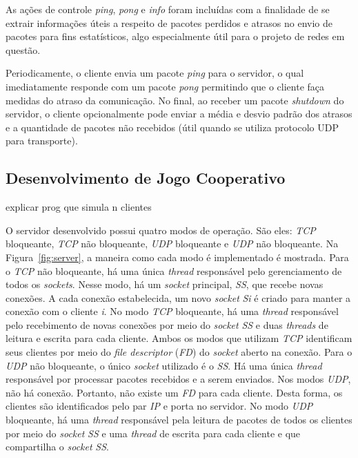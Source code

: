 \documentclass[12pt]{article}
\begin{document}
As ações de controle \textit{ping}, \textit{pong} e \textit{info} foram
incluídas com a finalidade de se extrair informações úteis a respeito de
pacotes perdidos e atrasos no envio de pacotes para fins estatísticos, algo
especialmente útil para o projeto de redes em questão.

Periodicamente, o cliente envia um pacote \textit{ping} para o servidor, o qual
imediatamente responde com um pacote \textit{pong} permitindo que o cliente
faça medidas do atraso da comunicação. No final, ao receber um pacote
\textit{shutdown} do servidor, o cliente opcionalmente pode enviar a média e
desvio padrão dos atrasos e a quantidade de pacotes não recebidos (útil quando
se utiliza protocolo UDP para transporte).

\subsection{Desenvolvimento de Jogo Cooperativo} \label{sub:desenvolvimento}

explicar prog que simula n clientes

O servidor desenvolvido possui quatro modos de operação. São eles: \emph{TCP} bloqueante, \emph{TCP} não bloqueante, \emph{UDP} bloqueante e \emph{UDP} não bloqueante. Na Figura~\ref{fig:server}, a maneira como cada modo é implementado é mostrada. Para o \emph{TCP} não bloqueante, há uma única \emph{thread} responsável pelo gerenciamento de todos os \emph{sockets}. Nesse modo, há um \emph{socket} principal, \emph{SS}, que recebe novas conexões. A cada conexão estabelecida, um novo \emph{socket} \emph{Si} é criado para manter a conexão com o cliente \emph{i}. No modo \emph{TCP} bloqueante, há uma \emph{thread} responsável pelo recebimento de novas conexões por meio do \emph{socket} \emph{SS} e duas \emph{threads} de leitura e escrita para cada cliente. Ambos os modos que utilizam \emph{TCP} identificam seus clientes por meio do \emph{file descriptor} (\emph{FD}) do \emph{socket} aberto na conexão. Para o \emph{UDP} não bloqueante, o único \emph{socket} utilizado é o \emph{SS}. Há uma única \emph{thread} responsável por processar pacotes recebidos e a serem enviados. Nos modos \emph{UDP}, não há conexão. Portanto, não existe um \emph{FD} para cada cliente. Desta forma, os clientes são identificados pelo par \emph{IP} e porta no servidor. No modo \emph{UDP} bloqueante, há uma \emph{thread} responsável pela leitura de pacotes de todos os clientes por meio do \emph{socket} \emph{SS} e uma \emph{thread} de escrita para cada cliente e que compartilha o \emph{socket} \emph{SS}. 
\end{document}
